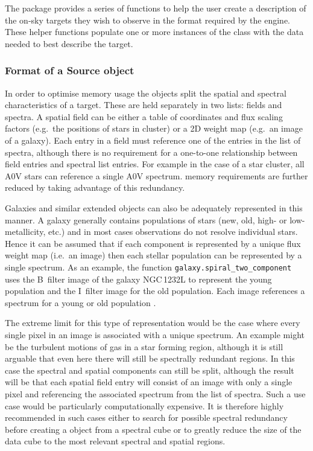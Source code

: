 The \scopesimtemplates{} package provides a series of functions to
help the user create a description of the on-sky targets they wish to
observe in the format required by the \ScopeSim{} engine.  These
helper functions populate one or more instances of the \ScopeSim{}
\Source{} class with the data needed to best describe the target.


\subsubsection{Format of a Source object}
\label{format-of-a-source-object}

In order to optimise memory usage the \Source{} objects split the
spatial and spectral characteristics of a target.  These are held
separately in two lists: fields and spectra.  A spatial field can be
either a table of coordinates and flux scaling factors (e.g.~the
positions of stars in cluster) or a 2D weight map (e.g.~an image of a
galaxy).  Each entry in a field must reference one of the entries in
the list of spectra, although there is no requirement for a one-to-one
relationship between field entries and spectral list entries.  For
example in the case of a star cluster, all A0V stars can reference a
single A0V spectrum.  \ScopeSim{} memory requirements are further
reduced by taking advantage of this redundancy.

Galaxies and similar extended objects can also be adequately
represented in this manner.  A galaxy generally contains populations
of stars (new, old, high- or low-metallicity, etc.) and in most cases
observations do not resolve individual stars.  Hence it can be assumed
that if each component is represented by a unique flux weight map
(i.e.~an image) then each stellar population can be represented by a
single spectrum.  As an example, the \scopesimtemplates{} function
\lstinline{galaxy.spiral_two_component} uses the B~filter image of the
galaxy NGC\,1232L to represent the young population and the I~filter
image for the old population.  Each image references a spectrum for a
young or old population \cite{brown2014}.

The extreme limit for this type of representation would be the case
where every single pixel in an image is associated with a unique
spectrum.  An example might be the turbulent motions of gas in a star
forming region, although it is still arguable that even here there
will still be spectrally redundant regions.  In this case the spectral
and spatial components can still be split, although the result will be
that each spatial field entry will consist of an image with only a
single pixel and referencing the associated spectrum from the list of
spectra.  Such a use case would be particularly computationally
expensive.  It is therefore highly recommended in such cases either to
search for possible spectral redundancy before creating a \Source{}
object from a spectral cube or to greatly reduce the size of the data
cube to the most relevant spectral and spatial regions.


